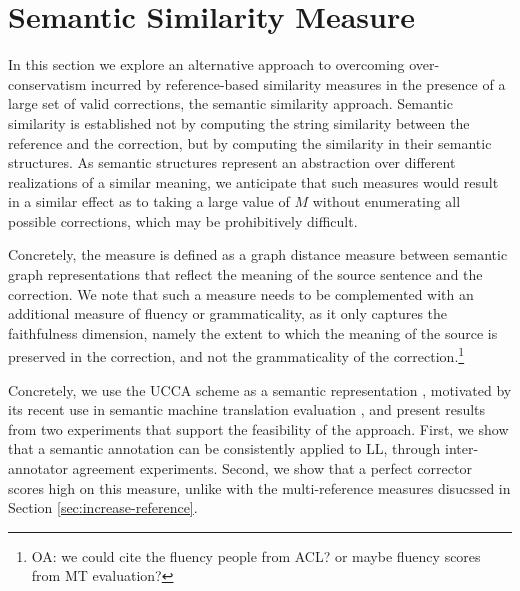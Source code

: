 \documentclass[letter,11pt]{article}
\newcommand{\oa}[1]{\footnote{\color{red}OA: #1}}
\begin{document}
\section{Semantic Similarity Measure}\label{sec:Semantics}



In this section we explore an alternative approach to overcoming over-conservatism
incurred by reference-based similarity measures in the presence of a large set of
valid corrections, the semantic similarity approach.
Semantic similarity is established not by computing the string similarity between
the reference and the correction, but by computing the similarity in their semantic
structures. As semantic structures represent an abstraction over different realizations
of a similar meaning, we anticipate that such measures would result in a similar
effect as to taking a large value of $M$ without enumerating all possible corrections,
which may be prohibitively difficult.

Concretely, the measure is defined as a graph distance measure between
semantic graph representations that reflect the meaning of the source
sentence and the correction.
We note that such a measure needs to be complemented with an additional
measure of fluency or grammaticality, as it only captures
the faithfulness dimension, namely the extent to which
the meaning of the source is preserved in the correction,
and not the grammaticality of the correction.\oa{we could cite the fluency people from ACL? or maybe fluency scores from MT evaluation?}

Concretely,
we use the UCCA scheme as a semantic representation \cite{abend2013universal}, motivated by
its recent use in semantic machine translation evaluation \cite{birch2016hume},
and present results from two experiments that support the feasibility of the approach.
First, we show that a semantic annotation can be consistently applied to LL,
through inter-annotator agreement experiments.
Second, we show that a perfect corrector scores high on this measure, unlike with
the multi-reference measures disucssed in Section \ref{sec:increase-reference}.
\end{document}
